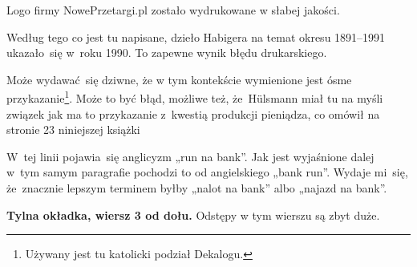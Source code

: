 \documentclass[a4paper,11pt]{article}
\begin{document}
\vspace{\spaceTwo}




\vspace{0em}



\vspace{0em}


\noindent
{} Logo firmy NowePrzetargi.pl zostało wydrukowane w słabej jakości.

\vspace{\spaceFour}





\noindent
{} Według tego co jest tu napisane, dzieło Habigera na
temat okresu 1891--1991 ukazało~się w~roku 1990. To zapewne wynik błędu
drukarskiego.

\vspace{\spaceFour}





\noindent
{} Może wydawać~się dziwne, że w tym kontekście wymienione jest
ósme przykazanie\footnote{Używany jest tu katolicki podział Dekalogu.}. Może
to być błąd, możliwe też, że~H\"{u}lsmann miał tu na myśli związek jak ma to
przykazanie z~kwestią produkcji pieniądza, co omówił na stronie 23
niniejszej książki

\vspace{\spaceFour}





\noindent
{} W~tej linii pojawia~się anglicyzm „run na bank”. Jak jest
wyjaśnione dalej w~tym samym paragrafie pochodzi to od angielskiego „bank
run”. Wydaje mi~się, że~znacznie lepszym terminem byłby „nalot na bank” albo
„najazd na bank”.

\vspace{\spaceFour}





\noindent
\textbf{Tylna okładka, wiersz 3 od dołu.} Odstępy w tym wierszu są
zbyt duże.
\end{document}
